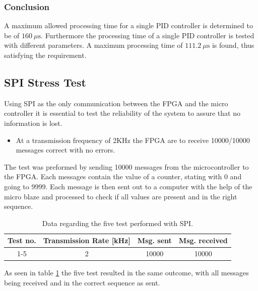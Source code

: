 \documentclass[../../main.tex]{subfiles}
\begin{document}
\subsubsection*{Conclusion}
A maximum allowed processing time for a single PID controller is determined to be of $\SI{160}{\mu\second}$. Furthermore the processing time of a single PID controller is tested with different parameters. A maximum processing time of $\SI{111,2}{\mu\second}$ is found, thus satisfying the requirement. 

\subsection{SPI Stress Test}
Using SPI as the only communication between the FPGA and the micro controller it is essential to test the reliability of the system to assure that no information is lost. 
\begin{itemize}
    \item At a transmission frequency of 2KHz the FPGA are to receive 10000/10000 messages correct with no errors.
\end{itemize}
The test was preformed by sending 10000 messages from the microcontroller to the FPGA. Each messages contain the value of a counter, stating with 0 and going to 9999. Each message is then sent out to a computer with the help of the micro blaze and processed to check if all values are present and in the right sequence.    
\begin{table}[H]
\centering
\begin{tabular}{cccc}
Test no. & Transmission Rate {[}kHz{]} & Msg. sent & Msg. received \\ \hline
1-5 & 2 & 10000 & 10000
\end{tabular}
\caption{Data regarding the five test performed with SPI.}
\label{tab:SPI-stresstest}
\end{table}

As seen in table \ref{tab:SPI-stresstest} the five test resulted in the same outcome, with all messages being received and in the correct sequence as sent. 
\end{document}
